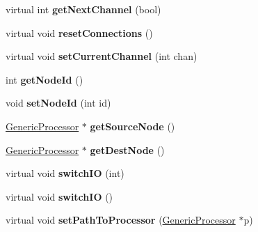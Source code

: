 \begin{DoxyCompactItemize}
\item 
\hypertarget{classGenericProcessor_a85a573cbf094b9e0b58caad89598b9b6}{virtual int {\bfseries get\-Next\-Channel} (bool)}\label{classGenericProcessor_a85a573cbf094b9e0b58caad89598b9b6}

\item 
\hypertarget{classGenericProcessor_a79f6e2e58b138bf070001d6bc8b7bb1d}{virtual void {\bfseries reset\-Connections} ()}\label{classGenericProcessor_a79f6e2e58b138bf070001d6bc8b7bb1d}

\item 
\hypertarget{classGenericProcessor_a887bc67d4ac284b65e3708e598845fa1}{virtual void {\bfseries set\-Current\-Channel} (int chan)}\label{classGenericProcessor_a887bc67d4ac284b65e3708e598845fa1}

\item 
\hypertarget{classGenericProcessor_ac9b78cf88078958fa27b08981f46e170}{int {\bfseries get\-Node\-Id} ()}\label{classGenericProcessor_ac9b78cf88078958fa27b08981f46e170}

\item 
\hypertarget{classGenericProcessor_a4d4245a009780a334517b0c242323f1b}{void {\bfseries set\-Node\-Id} (int id)}\label{classGenericProcessor_a4d4245a009780a334517b0c242323f1b}

\item 
\hypertarget{classGenericProcessor_a1f395b8e7bab82f54293337debcc9377}{\hyperlink{classGenericProcessor}{Generic\-Processor} $\ast$ {\bfseries get\-Source\-Node} ()}\label{classGenericProcessor_a1f395b8e7bab82f54293337debcc9377}

\item 
\hypertarget{classGenericProcessor_a222183cb80918b031531f381462a7a27}{\hyperlink{classGenericProcessor}{Generic\-Processor} $\ast$ {\bfseries get\-Dest\-Node} ()}\label{classGenericProcessor_a222183cb80918b031531f381462a7a27}

\item 
\hypertarget{classGenericProcessor_ab0fabe67cc2f3f8f5708ffba648a7178}{virtual void {\bfseries switch\-I\-O} (int)}\label{classGenericProcessor_ab0fabe67cc2f3f8f5708ffba648a7178}

\item 
\hypertarget{classGenericProcessor_a2081dd06eba70e46ba5770dbf04fadff}{virtual void {\bfseries switch\-I\-O} ()}\label{classGenericProcessor_a2081dd06eba70e46ba5770dbf04fadff}

\item 
\hypertarget{classGenericProcessor_a4aa819589398e892b3ceb89364db2b4c}{virtual void {\bfseries set\-Path\-To\-Processor} (\hyperlink{classGenericProcessor}{Generic\-Processor} $\ast$p)}\label{classGenericProcessor_a4aa819589398e892b3ceb89364db2b4c}


\end{DoxyCompactItemize}
